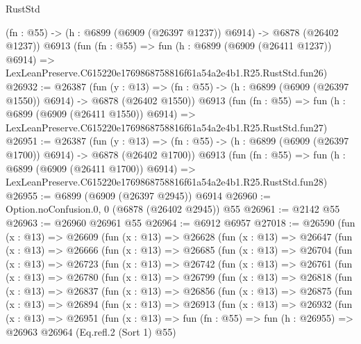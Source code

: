 \begin{lexlean}{RustStd}
\begin{coremodule}
    (fn : @55) -> (h : @6899 (@6909 (@26397 @1237)) @6914) -> @6878 (@26402 @1237))
    @6913
    (fun (fn : @55) =>
    fun (h : @6899 (@6909 (@26411 @1237)) @6914) =>
    LexLeanPreserve.C615220e1769868758816f61a54a2e4b1.R25.RustStd.fun26)
@26932 := @26387
    (fun (y : @13) =>
    (fn : @55) -> (h : @6899 (@6909 (@26397 @1550)) @6914) -> @6878 (@26402 @1550))
    @6913
    (fun (fn : @55) =>
    fun (h : @6899 (@6909 (@26411 @1550)) @6914) =>
    LexLeanPreserve.C615220e1769868758816f61a54a2e4b1.R25.RustStd.fun27)
@26951 := @26387
    (fun (y : @13) =>
    (fn : @55) -> (h : @6899 (@6909 (@26397 @1700)) @6914) -> @6878 (@26402 @1700))
    @6913
    (fun (fn : @55) =>
    fun (h : @6899 (@6909 (@26411 @1700)) @6914) =>
    LexLeanPreserve.C615220e1769868758816f61a54a2e4b1.R25.RustStd.fun28)
@26955 := @6899 (@6909 (@26397 @2945)) @6914
@26960 := Option.noConfusion.{0, 0} (@6878 (@26402 @2945)) @55
@26961 := @2142 @55
@26963 := @26960 @26961 @55
@26964 := @6912 @6957
@27018 := @26590
    (fun (x : @13) =>
    @26609
      (fun (x : @13) =>
      @26628
        (fun (x : @13) =>
        @26647
          (fun (x : @13) =>
          @26666
            (fun (x : @13) =>
            @26685
              (fun (x : @13) =>
              @26704
                (fun (x : @13) =>
                @26723
                  (fun (x : @13) =>
                  @26742
                    (fun (x : @13) =>
                    @26761
                      (fun (x : @13) =>
                      @26780
                        (fun (x : @13) =>
                        @26799
                          (fun (x : @13) =>
                          @26818
                            (fun (x : @13) =>
                            @26837
                              (fun (x : @13) =>
                              @26856
                                (fun (x : @13) =>
                                @26875
                                  (fun (x : @13) =>
                                  @26894
                                    (fun (x : @13) =>
                                    @26913
                                      (fun (x : @13) =>
                                      @26932
                                        (fun (x : @13) =>
                                        @26951
                                          (fun (x : @13) =>
                                          fun (fn : @55) =>
                                          fun (h : @26955) =>
                                          @26963
                                            @26964
                                            (Eq.refl.{2} (Sort 1) @55)

\end{coremodule}
\end{lexlean}
